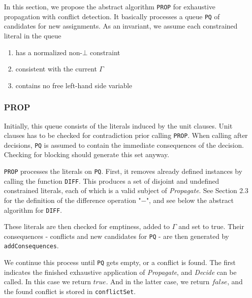 \documentclass[a4paper]{article}
\begin{document}
In this section, we propose the abstract algorithm \texttt{PROP} for exhaustive propagation with conflict detection.
It basically processes a queue \texttt{PQ} of candidates for new assignments. 
As an invariant, we assume each constrained literal in the queue 
\begin{enumerate}
	\item has a normalized non-$\bot$ constraint
	\item consistent with the current $\Gamma$
	\item contains no free left-hand side variable
\end{enumerate}
\subsubsection*{PROP}
Initially, this queue consists of the literals induced by the unit clauses. 
Unit clauses has to be checked for contradiction prior calling \texttt{PROP}.
When calling after decisions, \texttt{PQ} is assumed to contain the 
immediate consequences of the decision. 
Checking for blocking should generate this set anyway.

\texttt{PROP} processes the literals on \texttt{PQ}.
First, it removes already defined instances by calling the function \texttt{DIFF}.
This produces a set of disjoint and undefined constrained literals, each of which
is a valid subject of \emph{Propagate}.
See Section 2.3 for the definition of the difference operation "$-$", and see below 
the abstract algorithm for \texttt{DIFF}.

These literals are then checked for emptiness, added to $\Gamma$ and set to true.
Their consequences - conflicts and new candidates for \texttt{PQ} - 
are then generated by \texttt{addConsequences}.

We continue this process until \texttt{PQ} gets empty, or a conflict is found.
The first indicates the finished exhaustive application of \emph{Propagate}, and \emph{Decide} can be called. 
In this case we return $true$. And in the latter case, we return $false$, and the found conflict is 
stored in \texttt{conflictSet}.
\end{document}

